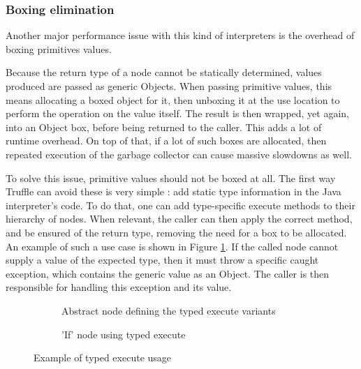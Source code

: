 \documentclass[twoside,11pt,a4paper]{article}
\newcommand{\java}[1]{\textsf{#1}}
\begin{document}
\subsubsection{Boxing elimination}

Another major performance issue with this kind of interpreters is the overhead of boxing primitives values.

Because the return type of a node cannot be statically determined, values produced are passed as generic \java{Objects}. When passing primitive values, this means allocating a boxed object for it, then unboxing it at the use location to perform the operation on the value itself. The result is then wrapped, yet again, into an \java{Object} box, before being returned to the caller. This adds a lot of runtime overhead. On top of that, if a lot of such boxes are allocated, then repeated execution of the garbage collector can cause massive slowdowns as well.

To solve this issue, primitive values should not be boxed at all. The first way Truffle can avoid these is very simple : add static type information in the Java interpreter's code. To do that, one can add type-specific \java{execute} methods to their hierarchy of nodes. When relevant, the caller can then apply the correct method, and be ensured of the return type, removing the need for a box to be allocated. An example of such a use case is shown in Figure \ref{fig:truffleifnode}. If the called node cannot supply a value of the expected type, then it must throw a specific caught exception, which contains the generic value as an \java{Object}. The caller is then responsible for handling this exception and its value.


\begin{figure}[t]

	\begin{subfigure}[h]{\textwidth}
		
		\caption{Abstract node defining the typed execute variants}
	\end{subfigure}
	
	\begin{subfigure}[h]{\textwidth}
		
		\caption{'If' node using typed execute}
	\end{subfigure}
	
	\caption{Example of typed execute usage}
	\label{fig:truffleifnode}
\end{figure}
\end{document}
